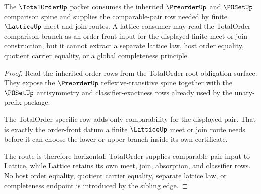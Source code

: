 \begin{theorem}
\label{thm:totalorder-lattice-sibling-route}
The $\TotalOrderUp$ packet consumes the inherited $\PreorderUp$ and $\POSetUp$
comparison spine and supplies the comparable-pair row needed by finite
$\LatticeUp$ meet and join routes. A lattice consumer may read the
TotalOrder comparison branch as an order-front input for the displayed finite
meet-or-join construction, but it cannot extract a separate lattice law, host
order equality, quotient carrier equality, or a global completeness principle.
\end{theorem}
\begin{proof}
Read the inherited order rows from the TotalOrder root obligation surface.
They expose the $\PreorderUp$ reflexive-transitive spine together with the
$\POSetUp$ antisymmetry and classifier-exactness rows already used by the
unary-prefix package.

The TotalOrder-specific row adds only comparability for the displayed pair.
That is exactly the order-front datum a finite $\LatticeUp$ meet or join
route needs before it can choose the lower or upper branch inside its own
certificate.

The route is therefore horizontal: TotalOrder supplies comparable-pair input
to Lattice, while Lattice retains its own meet, join, absorption, and
classifier rows. No host order equality, quotient carrier equality, separate
lattice law, or completeness endpoint is introduced by the sibling edge.
\end{proof}
